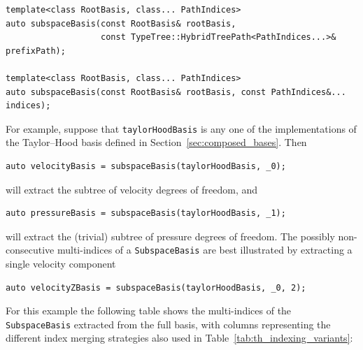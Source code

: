 \documentclass[a4paper,10pt,headings=normal,bibliography=totoc]{scrartcl}
\newcommand{\cpp}[1]{\lstinline[basicstyle=\ttfamily]!#1!}
\begin{document}
\begin{lstlisting}[style=Interface]
template<class RootBasis, class... PathIndices>
auto subspaceBasis(const RootBasis& rootBasis,
                   const TypeTree::HybridTreePath<PathIndices...>& prefixPath);

template<class RootBasis, class... PathIndices>
auto subspaceBasis(const RootBasis& rootBasis, const PathIndices&... indices);
\end{lstlisting}
%
For example, suppose that \cpp{taylorHoodBasis} is any one of the implementations
of the Taylor--Hood basis defined in Section~\ref{sec:composed_bases}.
Then
\begin{lstlisting}[style=Example]
auto velocityBasis = subspaceBasis(taylorHoodBasis, _0);
\end{lstlisting}
will extract the subtree of velocity degrees of freedom, and
\begin{lstlisting}[style=Example]
auto pressureBasis = subspaceBasis(taylorHoodBasis, _1);
\end{lstlisting}
will extract the (trivial) subtree of pressure degrees of freedom.
The possibly non-consecutive multi-indices of a \cpp{SubspaceBasis} are
best illustrated by extracting a single velocity component
\begin{lstlisting}[style=Example]
auto velocityZBasis = subspaceBasis(taylorHoodBasis, _0, 2);
\end{lstlisting}
For this example the following table shows the multi-indices
of the \cpp{SubspaceBasis} extracted from the full basis,
with columns representing the different index merging strategies also
used in Table~\ref{tab:th_indexing_variants}:

\medskip

\noindent
{}
\end{document}
